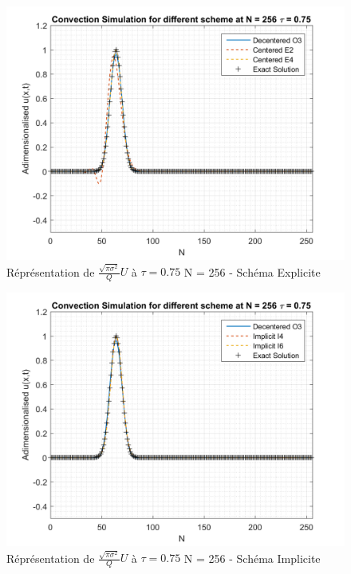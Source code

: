 \documentclass{article}
\begin{document}
\begin{figure}[H]
    \centering
    \includegraphics[scale=0.45]{img/fig4c1.png}
    \caption{Réprésentation de $\frac{\sqrt{\pi \sigma^2}}{Q} U$ à $\tau = 0.75$ N = 256 - Schéma Explicite}
    \label{fig4c1}
\end{figure}
\begin{figure}[H]
    \centering
    \includegraphics[scale=0.45]{img/fig4c2.png}
    \caption{Réprésentation de $\frac{\sqrt{\pi \sigma^2}}{Q} U$ à $\tau = 0.75$ N = 256 - Schéma Implicite}
    \label{fig4c2}
\end{figure}
\end{document}
